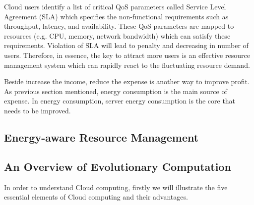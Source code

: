 
Cloud users identify a list of critical QoS parameters called Service Level Agreement (SLA) which specifies the non-functional requirements such as throughput, latency, and availability. These QoS parameters are mapped to resources (e.g. CPU, memory, network bandwidth) which can satisfy these requirements. Violation of SLA will lead to penalty and decreasing in number of users. Therefore, in essence, the key to attract more users is an effective resource management system which can rapidly react to the fluctuating resource demand. 

Beside increase the income, reduce the expense is another way to improve profit. As previous section mentioned, energy consumption is the main source of expense. In energy consumption, server energy consumption is the core that needs to be improved. 

\subsection{Energy-aware Resource Management}
\subsection{An Overview of Evolutionary Computation}


In order to understand Cloud computing, firstly we will illustrate the five essential elements of Cloud computing and their advantages.

